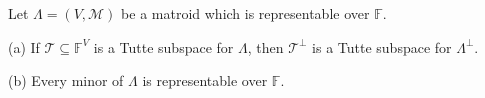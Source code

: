 Let $\Lambda = (V, \mathcal{M})$ be a matroid which is representable over $\mathbb{F}$.

(a) If $\mathcal{T} \subseteq \mathbb{F}^V$ is a Tutte subspace for $\Lambda$, then $\mathcal{T}^\perp$ is a Tutte subspace for $\Lambda^\perp$.

(b) Every minor of $\Lambda$ is representable over $\mathbb{F}$.
